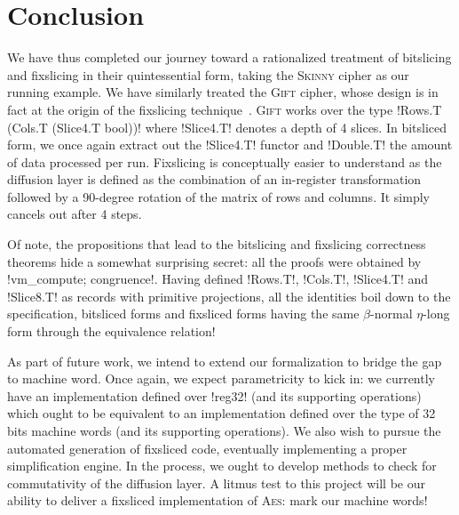 \documentclass[draft,english]{jflart}
\newcommand{\Skinny}{\textsc{Skinny}}
\newcommand{\Gift}{\textsc{Gift}}
\newcommand{\AES}{\textsc{Aes}}
\begin{document}
\section{Conclusion}

We have thus completed our journey toward a rationalized treatment of
bitslicing and fixslicing in their quintessential form, taking the
\Skinny{} cipher as our running example.
%
%
We have similarly treated the \Gift{} cipher, whose design is in fact at
the origin of the fixslicing
technique~\citep{adominicai:fixslicing-gift}. \Gift{} works over the type
%
\coqe!Rows.T (Cols.T (Slice4.T bool))!
%
where \coqe!Slice4.T! denotes a depth of 4 slices. In bitsliced form,
we once again extract out the \coqe!Slice4.T! functor and
\coqe!Double.T! the amount of data processed per run. Fixslicing is
conceptually easier to understand as the diffusion layer is defined as
the combination of an in-register transformation followed by a
90-degree rotation of the matrix of rows and columns. It simply
cancels out after 4 steps.


Of note, the propositions that lead to the bitslicing and fixslicing
correctness theorems hide a somewhat surprising secret: all the proofs
were obtained by \coqe!vm_compute; congruence!. Having defined
\coqe!Rows.T!, \coqe!Cols.T!, \coqe!Slice4.T! and \coqe!Slice8.T! as
records with primitive projections, all the identities boil down to
the specification, bitsliced forms and fixsliced forms having the
same $\beta$-normal $\eta$-long form through the equivalence
relation!



As part of future work, we intend to extend our formalization to
bridge the gap to machine word. Once again, we expect parametricity to
kick in: we currently have an implementation defined over \coqe!reg32!
(and its supporting operations) which ought to be equivalent to an
implementation defined over the type of 32 bits machine words (and its
supporting operations).
%
We also wish to pursue the automated generation of fixsliced code,
eventually implementing a proper simplification engine. In the
process, we ought to develop methods to check for commutativity of the
diffusion layer.
%
A litmus test to this project will be our ability to deliver a
fixsliced implementation of \AES{}: mark our machine words!

\clearpage



\end{document}
